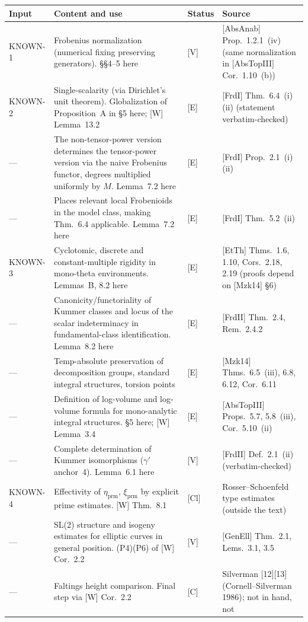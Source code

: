 \documentclass[11pt]{article}
\begin{document}
\begin{longtable}{p{2.1cm}p{6.4cm}p{1.1cm}p{4.6cm}}
\toprule
Input & Content and use & Status & Source\\
\midrule
\endhead
KNOWN-1 & Frobenius normalization (numerical fixing preserving
generators). \S\S4--5 here & [V] & [AbsAnab] Prop.~1.2.1~(iv) (same
normalization in [AbsTopIII] Cor.~1.10~(b))\\
KNOWN-2 & Single-scalarity (via Dirichlet's unit theorem).
Globalization of Proposition~A in \S5 here; [W] Lemma~13.2 & [E] &
[FrdI] Thm.~6.4~(i)(ii) (statement verbatim-checked)\\
--- & The non-tensor-power version determines the tensor-power
version via the naive Frobenius functor, degrees multiplied
uniformly by $M$. Lemma~7.2 here & [E] & [FrdI] Prop.~2.1~(i)(ii)\\
--- & Places relevant local Frobenioids in the model class, making
Thm.~6.4 applicable. Lemma~7.2 here & [E] & [FrdI]
Thm.~5.2~(ii)\\
KNOWN-3 & Cyclotomic, discrete and constant-multiple rigidity in
mono-theta environments. Lemmas~B, 8.2 here & [E] & [EtTh]
Thms.~1.6, 1.10, Cors.~2.18, 2.19 (proofs depend on [Mzk14] \S6)\\
--- & Canonicity/functoriality of Kummer classes and locus of the
scalar indeterminacy in fundamental-class identification.
Lemma~8.2 here & [E] & [FrdII] Thm.~2.4, Rem.~2.4.2\\
--- & Temp-absolute preservation of decomposition groups, standard
integral structures, torsion points & [E] & [Mzk14] Thms.~6.5~(iii),
6.8, 6.12, Cor.~6.11\\
--- & Definition of log-volume and log-volume formula for
mono-analytic integral structures. \S5 here; [W] Lemma~3.4 & [E] &
[AbsTopIII] Props.~5.7, 5.8~(iii), Cor.~5.10~(ii)\\
--- & Complete determination of Kummer isomorphisms ($\gamma'$
anchor~4). Lemma~6.1 here & [V] & [FrdII] Def.~2.1~(ii)
(verbatim-checked)\\
KNOWN-4 & Effectivity of $\eta_{\mathrm{prm}}$,
$\xi_{\mathrm{prm}}$ by explicit prime estimates. [W] Thm.~8.1 &
[Cl] & Rosser--Schoenfeld type estimates (outside the text)\\
--- & SL(2) structure and isogeny estimates for elliptic curves in
general position. (P4)(P6) of [W] Cor.~2.2 & [V] & [GenEll]
Thm.~2.1, Lems.~3.1, 3.5\\
--- & Faltings height comparison. Final step via [W] Cor.~2.2 & [C]
& Silverman [12][13] (Cornell--Silverman 1986); not in hand, not

\end{longtable}
\end{document}
